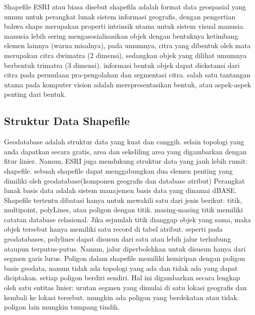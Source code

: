 Shapefile ESRI atau biasa disebut shapefila adalah format data geospasial yang umum untuk perangkat lunak sistem informasi geografis, dengan pengertian bahwa shape merupakan properti intrinsik utama untuk sistem visual manusia. manusia lebih sering mengasosialisasikan objek dengan bentuknya ketimbang elemen lainnya (warna misalnya), pada umumnya, citra yang dibentuk oleh mata merupakan citra dwimatra (2 dimensi), sedangkan objek yang dilihat umumnya berbentuk trimatra (3 dimensi). informasi bentuk objek dapat diekstansi dari citra pada permulaan pra-pengolahan dan segmentasi citra. salah satu tantangan utama pada komputer vision adalah merepresentasikan bentuk, atau aspek-aspek penting dari bentuk.

\subsection{Struktur Data Shapefile}
Geodatabase adalah struktur data yang kuat dan canggih. selain topologi yang anda dapatkan secara gratis, area dan sekeliling area yang
digambarkan dengan fitur linier. Namun, ESRI juga mendukung struktur data yang jauh lebih rumit: shapefile. sebuah shapefile dapat menggabungkan dua elemen penting yang dimiliki oleh geodatabase(komponen geografis dan database atribut) Perangkat lunak 
basis data adalah sistem manajemen basis data yang dinamai dBASE. Shapefile tertentu dibatasi hanya untuk mewakili satu dari jenis berikut: titik, multipoint, polyLines, atau poligon dengan titik. masing-masing titik memiliki catatan database relasional. Jika sejumlah titik dianggap objek yang sama, maka objek tersebut hanya memiliki satu record di tabel atribut. seperti pada geodatabases, polylines dapat disusun dari satu atau lebih jalur terhubung ataupun terputus-putus. Namun, jalur diperbolehkan untuk disusun hanya dari segmen garis lurus. Poligon dalam shapefile memiliki kemiripan dengan poligon basis geodata, namun tidak ada topologi yang ada dan tidak ada yang dapat diciptakan. setiap poligon berdiri sendiri. Hal ini digambarkan secara lengkap oleh satu entitas linier: urutan segmen yang dimulai di satu lokasi geografis dan kembali ke lokasi tersebut. mungkin ada poligon yang berdekatan atau tidak. poligon lain mungkin tumpang tindih.

